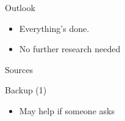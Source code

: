 \documentclass[en,navbaroff]{sdqbeamer} %
\begin{document}
\begin{frame}[t]{Outlook}
\begin{itemize}
\item Everything's done.
\item No further research needed
\end{itemize}
\end{frame}

\appendix
\beginbackup
\begin{frame}[t]{Sources}
\printbibliography
\end{frame}

\begin{frame}[t]{Backup (1)}
\begin{itemize}
\item May help if someone asks
\end{itemize}
\end{frame}

\backupend
\end{document}

